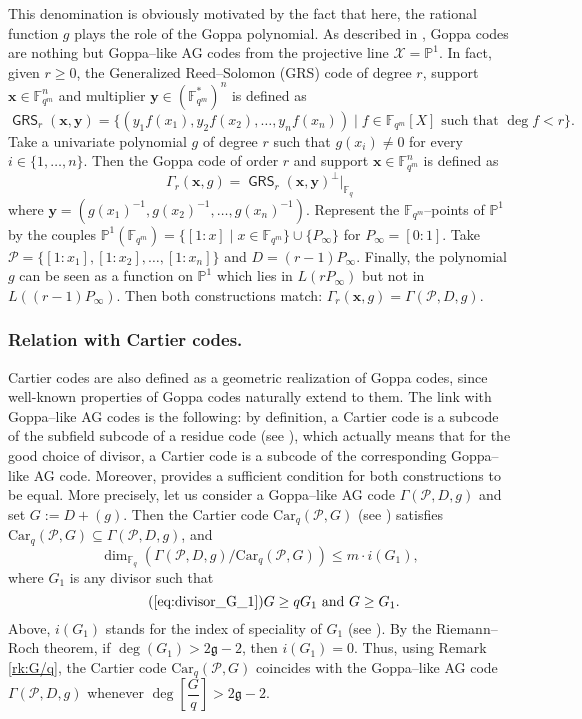 \documentclass[a4paper]{article}
\theoremstyle{definition}
\theoremstyle{remark}
\newcommand{\calP}{\mathcal{P}}
\newcommand{\calX}{\mathcal{X}}
\newcommand{\fqm}{\mathbb{F}_{q^m}}
\newcommand{\fq}{\mathbb{F}_{q}}
\newcommand{\PP}{\mathbb{P}}
\newcommand{\GRS}{\operatorname{\mathsf{GRS}}}
\begin{document}
This denomination is obviously motivated by the fact that here, the rational function $g$ plays the role of the Goppa polynomial. As described in \cite[Example~9.1.8]{Sti09}, Goppa codes are nothing but Goppa--like AG codes from the projective line $\calX=\PP^1$. In fact, given $r \geq 0$, the Generalized Reed--Solomon (GRS) code of degree $r$, support $\mathbf{x} \in \fqm^n$ and multiplier $\mathbf{y} \in (\fqm^*)^n$ is defined as
\[\GRS_r(\mathbf{x},\mathbf{y})=\{(y_1f(x_1),y_2f(x_2),\dots,y_nf(x_n)) \mid f \in \fqm[X] \text{ such that } \deg f < r \}.\]
Take a univariate polynomial $g$ of degree $r$ such that $g(x_i) \neq 0$ for every  $i \in \{1,\dots,n\}$. Then the Goppa code of order $r$ and support $\mathbf{x} \in \fqm^n$ is defined as
\[\Gamma_r(\mathbf{x},g)= \GRS_r(\mathbf{x},\mathbf{y})^\perp|_{\fq}\]
where $\mathbf{y}=(g(x_1)^{-1},g(x_2)^{-1},\dots,g(x_n)^{-1})$.
Represent the $\fqm$--points of $\PP^1$ by the couples $\PP^1(\fqm)=\{[1:x] \mid x \in \fqm\} \cup \{P_\infty\}$ for $P_\infty=[0:1]$. Take $\calP=\{[1:x_1],[1:x_2],\dots,[1:x_n]\}$ and $D=(r-1)P_\infty$. Finally, the polynomial $g$ can be seen as a function on $\PP^1$ which lies in $L(rP_\infty)$ but not in $L((r-1)P_\infty)$. Then both constructions match: $\Gamma_r(\mathbf{x},g)=\Gamma(\calP,D,g)$.

\subsubsection{Relation with Cartier codes.} Cartier codes \cite{Cou14} are also defined as a geometric realization of Goppa codes, since well-known properties of Goppa codes naturally extend to them.
The link with Goppa--like AG codes is the following: by definition, a Cartier code is a subcode of the subfield subcode of a residue code (see \cite[Proposition 4.3]{Cou14}), which actually means that for the good choice of divisor, a Cartier code is a subcode of the corresponding Goppa--like AG code. Moreover, \cite[Theorem 5.1]{Cou14} provides a sufficient condition for both constructions to be equal. More precisely, let us consider a Goppa--like AG code $\Gamma(\calP,D,g)$  and set $G := D+(g)$. Then the Cartier code $\mathrm{Car}_q(\calP,G)$ (see \cite[Definition 4.2]{Cou14}) satisfies $\mathrm{Car}_q(\calP,G) \subseteq \Gamma(\calP,D,g)$, and 
$$ \dim_{\fq} \left( \Gamma(\calP,D,g)/ \mathrm{Car}_q(\calP,G)\right) \leq m \cdot i(G_1),$$
where $G_1$ is any divisor such that 
\begin{equation} \tag{\ref{eq:divisor_G_1}}
G \geq qG_1 \ \mathrm{and} \ G \geq G_1.
\end{equation}
 Above, $i(G_1)$ stands for the index of speciality of $G_1$ (see \cite[Definition~1.6.10]{Sti09}). By the Riemann--Roch theorem, if $\deg(G_1) > 2\mathfrak{g}-2$, then $i(G_1) =0.$ 
Thus, using Remark \ref{rk:G/q}, the Cartier code $\mathrm{Car}_q(\calP,G)$ coincides with the Goppa--like AG code $\Gamma(\calP,D,g)$ whenever $\deg\left[\dfrac{G}{q} \right] > 2\mathfrak{g}-2$. 
\end{document}
